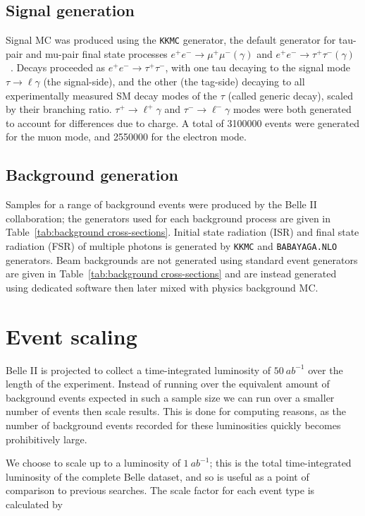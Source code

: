\documentclass[12pt]{thesis}  %
\begin{document}
\subsection{Signal generation}

Signal MC was produced using the \texttt{KKMC} generator, the default generator for tau-pair and mu-pair final state processes $e^+ e^-\to\mu^+ \mu^-(\gamma)$ and $e^+ e^- \to \tau^+ \tau^- (\gamma)$~\cite{BelleII:simulation}. Decays proceeded as $e^+ e^- \to \tau^+ \tau^-$, with one tau decaying to the signal mode $\tau \to \ell \gamma$ (the signal-side), and the other (the tag-side) decaying to all experimentally measured SM decay modes of the $\tau$ (called generic decay), scaled by their branching ratio. $\tau^+ \to \ell^+ \gamma$ and $\tau^- \to \ell^- \gamma$ modes were both generated to account for differences due to charge. A total of \num{3100000} events were generated for the muon mode, and \num{2550000} for the electron mode.

\subsection{Background generation}

Samples for a range of background events were produced by the Belle II collaboration; the generators used for each background process are given in Table~\ref{tab:background cross-sections}. Initial state radiation (ISR) and final state radiation (FSR) of multiple photons is generated by \texttt{KKMC} and \texttt{BABAYAGA.NLO} generators. Beam backgrounds are not generated using standard event generators are given in Table~\ref{tab:background cross-sections} and are instead generated using dedicated software then later mixed with physics background MC.

\section{Event scaling}

Belle II is projected to collect a time-integrated luminosity of $\SI{50}{ab^{-1}}$ over the length of the experiment. Instead of running over the equivalent amount of background events expected in such a sample size we can run over a smaller number of events then scale results. This is done for computing reasons, as the number of background events recorded for these luminosities quickly becomes prohibitively large.

We choose to scale up to a luminosity of $\SI{1}{ab^{-1}}$; this is the total time-integrated luminosity of the complete Belle dataset, and so is useful as a point of comparison to previous searches. The scale factor for each event type is calculated by
\end{document}
